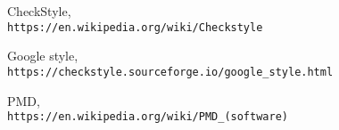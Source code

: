 \documentclass[12pt]{report}
\begin{document}
\begin{thebibliography}{9}
CheckStyle,
\\\texttt{https://en.wikipedia.org/wiki/Checkstyle}

Google style,
\\\texttt{https://checkstyle.sourceforge.io/google\_style.html}

PMD,
\\\texttt{https://en.wikipedia.org/wiki/PMD\_(software)}
\end{thebibliography}
\end{document}
